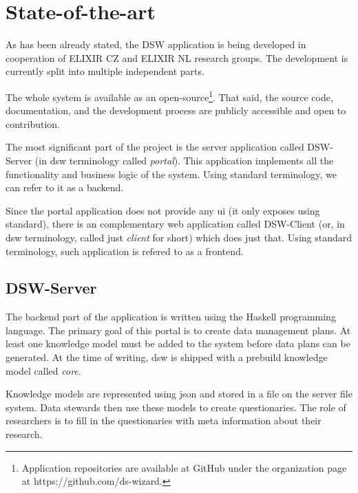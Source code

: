 \section{State-of-the-art}

As has been already stated, the DSW application is being developed in cooperation of ELIXIR CZ and ELIXIR NL research groups.
The development is currently split into multiple independent parts.

The whole system is available as an open-source\footnote{Application repositories are available at GitHub under the organization page at https://github.com/ds-wizard.}.
That said, the source code, documentation, and the development process are publicly accessible and open to contribution.

The most significant part of the project is the server application called DSW-Server (in \gls{dsw} terminology called \textit{portal}).
This application implements all the functionality and business logic of the system.
Using standard terminology, we can refer to it as a backend.

Since the portal application does not provide any \gls{ui} (it only exposes  using  standard), there is an complementary web application called DSW-Client (or, in \gls{dsw} terminology, called just \textit{client} for short) which does just that.
Using standard terminology, such application is refered to as a frontend.


\subsection{DSW-Server}

The backend part of the application is written using the Haskell programming language.
The primary goal of this portal is to create data management plans. 
At least one knowledge model must be added to the system before data plans can be generated.
At the time of writing, \gls{dsw} is shipped with a prebuild knowledge model called \textit{core}.

Knowledge models are represented using \gls{json} and stored in a file on the server file system.
Data stewards then use these models to create questionaries.
The role of researchers is to fill in the questionaries with meta information about their research.

